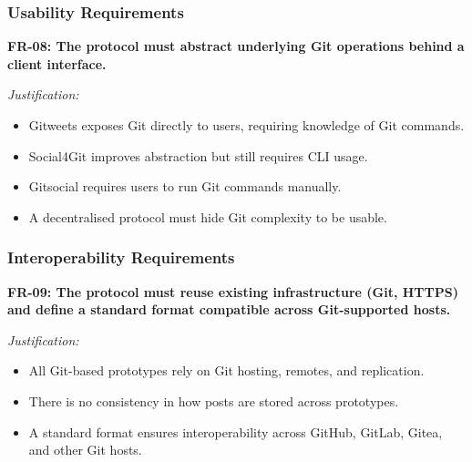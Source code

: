 \subsubsection*{Usability Requirements}

\textbf{FR-08: The protocol must abstract underlying Git operations behind a client interface.}

\textit{Justification:}
\begin{itemize}
    \item Gitweets exposes Git directly to users, requiring knowledge of Git commands.
    \item Social4Git improves abstraction but still requires CLI usage.
    \item Gitsocial requires users to run Git commands manually.
    \item A decentralised protocol must hide Git complexity to be usable.
\end{itemize}

\subsubsection*{Interoperability Requirements}

\textbf{FR-09: The protocol must reuse existing infrastructure (Git, HTTPS) and define a standard format compatible across Git-supported hosts.}

\textit{Justification:}
\begin{itemize}
    \item All Git-based prototypes rely on Git hosting, remotes, and replication.
    \item There is no consistency in how posts are stored across prototypes.
    \item A standard format ensures interoperability across GitHub, GitLab, Gitea, and other Git hosts.
\end{itemize}
